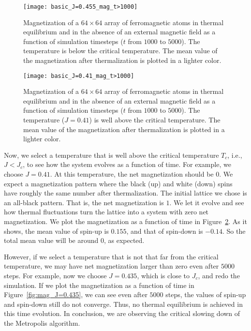 \begin{figure}[hbt]
    \centering
    \texttt{[image: basic\_J=0.455\_mag\_t>1000]}
    \caption{Magnetization of a \(64 \times 64\) array of ferromagnetic atoms in thermal
        equilibrium and in the absence of an external magnetic field as a function of
        simulation timesteps (\(t\) from \(1000\) to \(5000\)). The temperature is below the
        critical temperature. The mean value of the magnetization after thermalization is
        plotted in a lighter color.}
    \label{fig:mag_J=0.455}
\end{figure}

\begin{figure}[hbt]
    \centering
    \texttt{[image: basic\_J=0.41\_mag\_t>1000]}
    \caption{Magnetization of a \(64 \times 64\) array of ferromagnetic atoms in thermal
        equilibrium and in the absence of an external magnetic field as a function of
        simulation timesteps (\(t\) from \(1000\) to \(5000\)). The temperature
        (\(J = 0.41\)) is well above the critical temperature. The mean value of the
        magnetization after thermalization is plotted in a lighter color.}
    \label{fig:mag_J=0.41}
\end{figure}

Now, we select a temperature that is well above the critical temperature \(T_c\),
i.e., \(J < J_c\), to see how the system evolves as a function of time.
For example, we choose \(J = 0.41\). At this temperature, the net magnetization should
be \(0\). We expect a magnetization pattern where the black (up) and
white (down) spins have roughly the same number after thermalization.
The initial lattice we chose is an all-black pattern. That is, the net magnetization
is \(1\). We let it evolve and see how thermal fluctuations turn the lattice into
a system with zero net magnetization.
We plot the magnetization as a function of time in Figure~\ref{fig:mag_J=0.41}.
As it shows, the mean value of spin-up is \(0.155\), and that of spin-down is \(-0.14\).
So the total mean value will be around \(0\), as expected.

However, if we select a temperature that is not that far from the critical temperature,
we may have net magnetization larger than zero even after \(5000\) steps.
For example, now we choose \(J = 0.435\), which is close to \(J_c\), and redo the
simulation.
If we plot the magnetization as a function of time in Figure~\ref{fig:mag_J=0.435},
we can see even after \(5000\) steps, the values of spin-up and spin-down still do
not converge. Thus, no thermal equilibrium is achieved in this time evolution.
In conclusion, we are observing the critical slowing down of the 
Metropolis algorithm.

